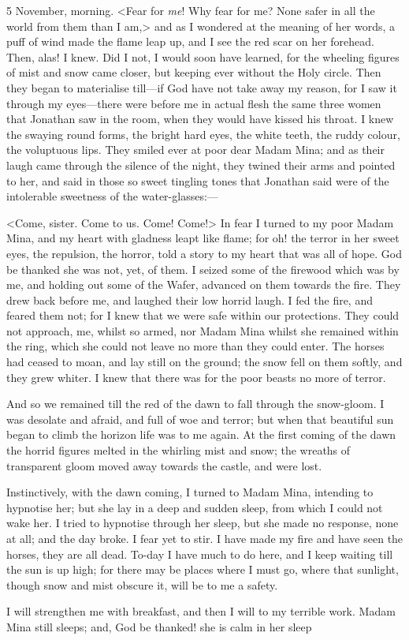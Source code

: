 \begin{diary}{5 November, morning.}
<Fear for \textit{me}! Why fear for me? None safer in all the world from them than I am,> and as I wondered at the meaning of her words, a puff of wind made the flame leap up, and I see the red scar on her forehead. Then, alas! I knew. Did I not, I would soon have learned, for the wheeling figures of mist and snow came closer, but keeping ever without the Holy circle. Then they began to materialise till—if God have not take away my reason, for I saw it through my eyes—there were before me in actual flesh the same three women that Jonathan saw in the room, when they would have kissed his throat. I knew the swaying round forms, the bright hard eyes, the white teeth, the ruddy colour, the voluptuous lips. They smiled ever at poor dear Madam Mina; and as their laugh came through the silence of the night, they twined their arms and pointed to her, and said in those so sweet tingling tones that Jonathan said were of the intolerable sweetness of the water-glasses:—

<Come, sister. Come to us. Come! Come!> In fear I turned to my poor Madam Mina, and my heart with gladness leapt like flame; for oh! the terror in her sweet eyes, the repulsion, the horror, told a story to my heart that was all of hope. God be thanked she was not, yet, of them. I seized some of the firewood which was by me, and holding out some of the Wafer, advanced on them towards the fire. They drew back before me, and laughed their low horrid laugh. I fed the fire, and feared them not; for I knew that we were safe within our protections. They could not approach, me, whilst so armed, nor Madam Mina whilst she remained within the ring, which she could not leave no more than they could enter. The horses had ceased to moan, and lay still on the ground; the snow fell on them softly, and they grew whiter. I knew that there was for the poor beasts no more of terror.

And so we remained till the red of the dawn to fall through the snow-gloom. I was desolate and afraid, and full of woe and terror; but when that beautiful sun began to climb the horizon life was to me again. At the first coming of the dawn the horrid figures melted in the whirling mist and snow; the wreaths of transparent gloom moved away towards the castle, and were lost.

Instinctively, with the dawn coming, I turned to Madam Mina, intending to hypnotise her; but she lay in a deep and sudden sleep, from which I could not wake her. I tried to hypnotise through her sleep, but she made no response, none at all; and the day broke. I fear yet to stir. I have made my fire and have seen the horses, they are all dead. To-day I have much to do here, and I keep waiting till the sun is up high; for there may be places where I must go, where that sunlight, though snow and mist obscure it, will be to me a safety.

I will strengthen me with breakfast, and then I will to my terrible work. Madam Mina still sleeps; and, God be thanked! she is calm in her sleep
	\end{diary}

